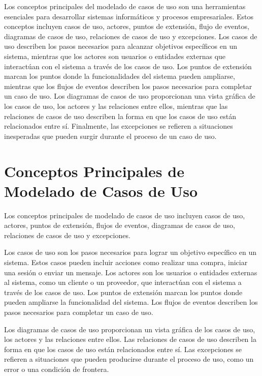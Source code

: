 \documentclass[12pt]{article}
\begin{document}
Los conceptos principales del modelado de casos de uso
son una herramientas esenciales para desarrollar sistemas 
informáticos y procesos empresariales. Estos conceptos 
incluyen casos de uso, actores, puntos de extensión, 
flujo de eventos, diagramas de casos de uso, relaciones
de casos de uso y excepciones. Los casos de uso describen
los pasos necesarios para alcanzar objetivos 
específicos en un sistema, mientras que los actores
son usuarios o entidades externas que interactúan con
el sistema a través de los casos de uso. Los puntos de 
extensión marcan los puntos donde la funcionalidades
del sistema pueden ampliarse, mientras que los flujos 
de eventos describen los pasos necesarios para 
completar un caso de uso. Los diagramas de casos de uso
proporcionan una vista gráfica de los casos de uso, los 
actores y las relaciones entre ellos, mientras que las
relaciones de casos de uso describen la forma en que 
los casos de uso están relacionados entre sí. Finalmente, las excepciones se refieren a situaciones
inesperadas que pueden surgir durante el proceso de un
caso de uso.

\vspace{1cm}
\section{Conceptos Principales de Modelado de Casos de Uso}

Los conceptos principales de modelado de casos de uso
incluyen casos de uso, actores, puntos de extensión,
flujos de eventos, diagramas de casos de uso, 
relaciones de casos de uso y excepciones.

Los casos de uso son los pasos necesarios para lograr un
objetivo específico en un sistema. Estos casos pueden
incluir acciones como realizar una compra, iniciar una
sesión o enviar un mensaje. Los actores son los 
usuarios o entidades externas al sistema, como un cliente
o un proveedor, que interactúan con el sistema a través 
de los casos de uso. Los puntos de extensión marcan los 
puntos donde pueden ampliarse la funcionalidad del 
sistema. Los flujos de eventos describen los pasos 
necesarios para completar un caso de uso.

Los diagramas de casos de uso proporcionan un vista 
gráfica de los casos de uso, los actores y las
relaciones entre ellos. Las relaciones de casos de uso
describen la forma en que los casos de uso están
relacionados entre sí. Las excepciones se refieren a 
situaciones que pueden producirse durante el proceso
de uso, como un error o una condición de frontera.\\
\end{document}
